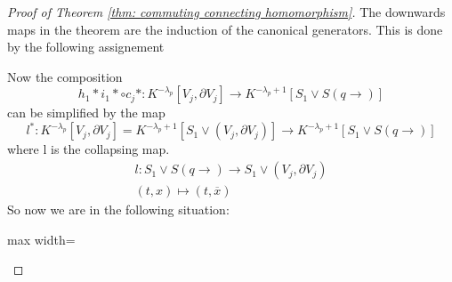 \begin{proof}[Proof of Theorem \ref{thm: commuting connecting homomorphism}]
		The downwards maps in the theorem are the induction of the canonical generators. This is done by the following assignement
		
		
		
		Now the composition \begin{equation*}
			h_1*i_1*\circ c_j*: K^{-\lambda_p}\left[ V_j,\partial V_j \right] \to K^{-\lambda_p+1}\left[S_1\vee S(q\to) \right]
		\end{equation*} can be simplified by the map
		\begin{equation*}
			l^*:	K^{-\lambda_p}\left[ V_j,\partial V_j \right]=K^{-\lambda_p+1}\left[S_1\vee\left( V_j,\partial V_j\right) \right] \to K^{-\lambda_p+1}\left[S_1\vee S(q\to) \right]
		\end{equation*} where l is the collapsing map.
		\begin{align*}
			l:S_1\vee S(q\to)  \to S_1\vee\left( V_j,\partial V_j\right)\\
			(t,x)\mapsto (t,\overline{x})
		\end{align*} So now we are in the following situation: 
		\begin{fdiagram}
			\begin{adjustbox}{max width=\textwidth}
\end{adjustbox}
\end{fdiagram}
\end{proof}

